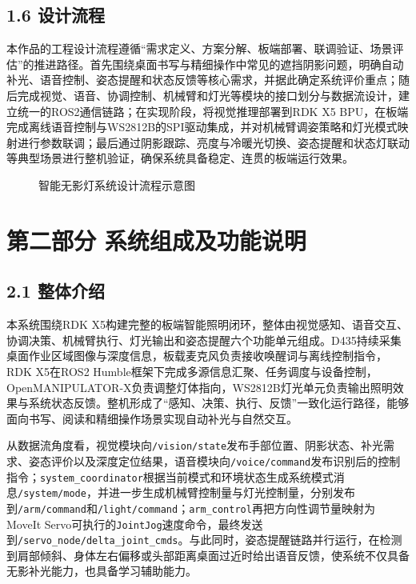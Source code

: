 \documentclass[UTF8,a4paper,zihao=-4]{ctexart}
\newcommand{\ImagePlaceholder}[2]{%
  \begin{figure}[htbp]
    \centering
    \fbox{\parbox[c][#2][c]{0.86\textwidth}{\centering #1}}
    \caption{#1}
  \end{figure}
}
\begin{document}
\subsection*{1.6 设计流程}

本作品的工程设计流程遵循“需求定义、方案分解、板端部署、联调验证、场景评估”的推进路径。首先围绕桌面书写与精细操作中常见的遮挡阴影问题，明确自动补光、语音控制、姿态提醒和状态反馈等核心需求，并据此确定系统评价重点；随后完成视觉、语音、协调控制、机械臂和灯光等模块的接口划分与数据流设计，建立统一的ROS2通信链路；在实现阶段，将视觉推理部署到RDK X5 BPU，在板端完成离线语音控制与WS2812B的SPI驱动集成，并对机械臂调姿策略和灯光模式映射进行参数联调；最后通过阴影跟踪、亮度与冷暖光切换、姿态提醒和状态灯联动等典型场景进行整机验证，确保系统具备稳定、连贯的板端运行效果。

\ImagePlaceholder{智能无影灯系统设计流程示意图}{4.5cm}

\section*{第二部分 系统组成及功能说明}

\subsection*{2.1 整体介绍}

本系统围绕RDK X5构建完整的板端智能照明闭环，整体由视觉感知、语音交互、协调决策、机械臂执行、灯光输出和姿态提醒六个功能单元组成。D435持续采集桌面作业区域图像与深度信息，板载麦克风负责接收唤醒词与离线控制指令，RDK X5在ROS2 Humble框架下完成多源信息汇聚、任务调度与设备控制，OpenMANIPULATOR-X负责调整灯体指向，WS2812B灯光单元负责输出照明效果与系统状态反馈。整机形成了“感知、决策、执行、反馈”一致化运行路径，能够面向书写、阅读和精细操作场景实现自动补光与自然交互。

从数据流角度看，视觉模块向\texttt{/vision/state}发布手部位置、阴影状态、补光需求、姿态评价以及深度定位结果，语音模块向\texttt{/voice/command}发布识别后的控制指令；\texttt{system\_coordinator}根据当前模式和环境状态生成系统模式消息\texttt{/system/mode}，并进一步生成机械臂控制量与灯光控制量，分别发布到\texttt{/arm/command}和\texttt{/light/command}；\texttt{arm\_control}再把方向性调节量映射为MoveIt Servo可执行的\texttt{JointJog}速度命令，最终发送到\texttt{/servo\_node/delta\_joint\_cmds}。与此同时，姿态提醒链路并行运行，在检测到肩部倾斜、身体左右偏移或头部距离桌面过近时给出语音反馈，使系统不仅具备无影补光能力，也具备学习辅助能力。
\end{document}
